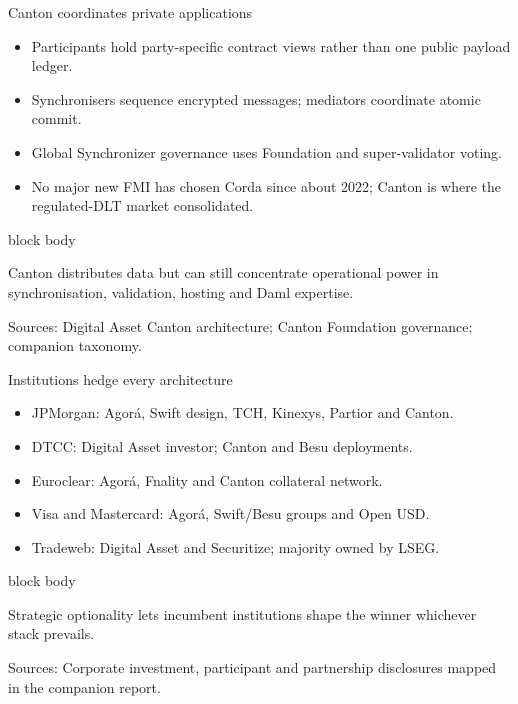 \documentclass[aspectratio=169,12pt]{beamer}
\newcommand{\source}[1]{\vfill\par\fontsize{5.4}{6.5}\selectfont\color{Quiet}Sources: #1}
\newcommand{\tightitems}{\setlength{\itemsep}{0.42em}\setlength{\parskip}{0pt}}
\newenvironment{statement}{%
  \begin{beamercolorbox}[sep=.18cm,rounded=false,wd=\linewidth]{block body}%
  \fontsize{13}{15.5}\selectfont\bfseries
}{\end{beamercolorbox}}
\begin{document}
\begin{frame}{Canton coordinates private applications} %
  \begin{itemize}\tightitems
    \item Participants hold party-specific contract views rather than one public payload ledger.
    \item Synchronisers sequence encrypted messages; mediators coordinate atomic commit.
    \item Global Synchronizer governance uses Foundation and super-validator voting.
    \item No major new FMI has chosen Corda since about 2022; Canton is where the regulated-DLT market consolidated.
  \end{itemize}
  \begin{statement}
    Canton distributes data but can still concentrate operational power in synchronisation, validation, hosting and Daml expertise.
  \end{statement}
  \source{Digital Asset Canton architecture; Canton Foundation governance; companion taxonomy.}
\end{frame}

\begin{frame}{Institutions hedge every architecture}
  \begin{itemize}\tightitems
    \item JPMorgan: Agor\'a, Swift design, TCH, Kinexys, Partior and Canton.
    \item DTCC: Digital Asset investor; Canton and Besu deployments.
    \item Euroclear: Agor\'a, Fnality and Canton collateral network.
    \item Visa and Mastercard: Agor\'a, Swift/Besu groups and Open USD.
    \item Tradeweb: Digital Asset and Securitize; majority owned by LSEG.
  \end{itemize}
  \begin{statement}
    Strategic optionality lets incumbent institutions shape the winner whichever stack prevails.
  \end{statement}
  \source{Corporate investment, participant and partnership disclosures mapped in the companion report.}
\end{frame}
\end{document}
